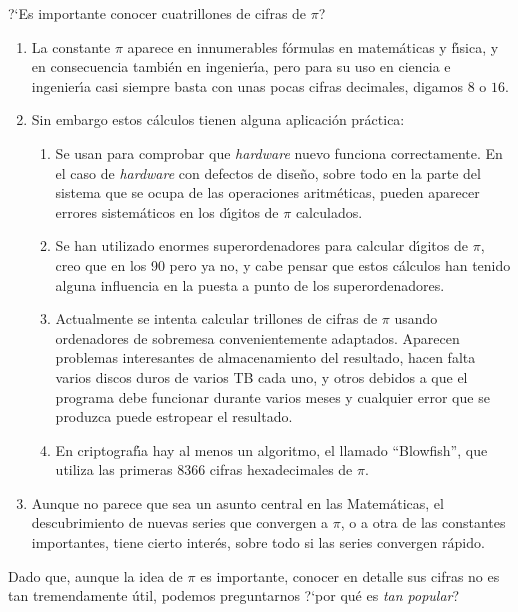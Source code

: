 ?`Es importante conocer cuatrillones de cifras de $\pi$?
\begin{enumerate}
 \item La constante $\pi$ aparece en innumerables f\'ormulas en matem\'aticas y
 f\'{\i}sica, y en consecuencia tambi\'en en ingenier\'{\i}a, pero para su uso
en ciencia e ingenier\'{\i}a casi siempre basta con unas pocas cifras decimales,
digamos $8$
o $16$. 
\item Sin embargo  estos c\'alculos tienen alguna aplicaci\'on pr\'actica:
\begin{enumerate}
\item Se usan para comprobar que  {\itshape hardware} nuevo funciona
correctamente. 
En el caso de {\itshape hardware} con defectos de dise\~no, sobre todo en la
parte del sistema que se ocupa de las operaciones aritm\'eticas,  pueden
aparecer errores sistem\'aticos en los d\'{\i}gitos de $\pi$ calculados.
\item Se han utilizado enormes superordenadores para calcular d\'{\i}gitos de
$\pi$, 
creo que en los 90 pero ya no, y cabe pensar que estos c\'alculos han tenido
alguna influencia en la puesta a punto de los superordenadores.
\item Actualmente se intenta calcular trillones de cifras de $\pi$ usando
ordenadores
de sobremesa convenientemente adaptados. Aparecen problemas interesantes de
almacenamiento
del resultado, hacen falta varios discos duros de varios TB cada uno, y otros
debidos a que
el programa debe funcionar  durante varios meses y cualquier error que se
produzca puede estropear el resultado. 
\item En criptograf\'{\i}a hay al menos un algoritmo, el llamado ``Blowfish'',
que utiliza las primeras  $8366$ cifras hexadecimales de $\pi$.
\end{enumerate}
\item Aunque no parece que sea un asunto central en las Matem\'aticas, el
descubrimiento de nuevas series que convergen a $\pi$, o a otra de las
constantes importantes, tiene cierto inter\'es, sobre todo si las series
convergen r\'apido.
\end{enumerate}


Dado que, aunque la idea  de $\pi$ es importante,  conocer en detalle sus cifras
no es tan tremendamente \'util, podemos preguntarnos ?`por qu\'e es {\itshape
tan
popular}?

